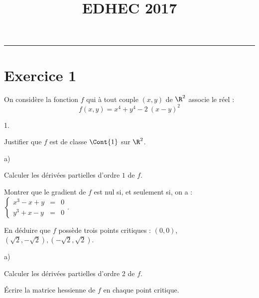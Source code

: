 \documentclass[11pt]{article}%
\title{\bf \vspace{-2cm} EDHEC 2017} %
\author{} %
\date{} %
\begin{document}
\maketitle %
\vspace{-1.4cm}\hrule %
\thispagestyle{fancy}

\vspace*{.2cm}


\section*{Exercice 1}

\noindent
On considère la fonction $f$ qui à tout couple $(x,y)$ de $\R^{2}$
associe le réel :
\[
f(x,y) = x^{4} + y^{4} - 2 \ (x-y)^{2}
\]
\begin{noliste}{1.}
  \setlength{\itemsep}{4mm}
\item Justifier que $f$ est de classe $\Cont{1}$ sur $\R^{2}$.

  

\item
  \begin{noliste}{a)}
    \setlength{\itemsep}{2mm}
  \item Calculer les dérivées partielles d'ordre $1$ de $f$.

    

  \item Montrer que le gradient de $f$ est nul si, et seulement si, on
    a : $ \left\{
      \begin{array}{rcl}
        x^{3}-x + y & = & 0 \\
        y^{3} + x-y & = & 0
      \end{array}
    \right.$.

    

  \item En déduire que $f$ possède trois points critiques : $(0,0)$,
    $(\sqrt{2},-\sqrt{2}), (-\sqrt{2},\sqrt{2})$.

    
  \end{noliste}




\item
  \begin{noliste}{a)}
    \setlength{\itemsep}{2mm}
  \item Calculer les dérivées partielles d'ordre 2 de $f$.

    

  \item Écrire la matrice hessienne de $f$ en chaque point critique.


\end{noliste}
\end{noliste}
\end{document}
